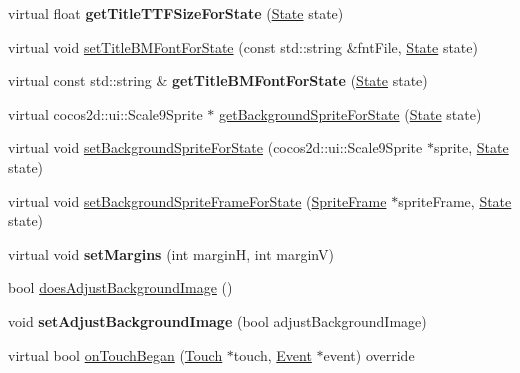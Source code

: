 \begin{DoxyCompactItemize}
\item 
\mbox{\label{classControlButton_a71d45fe402f7fe262440166504de41fb}} 
virtual float {\bfseries get\+Title\+T\+T\+F\+Size\+For\+State} (\hyperlink{classControl_a89e9598cd785841ac91cff3c4798c469}{State} state)
\item 
virtual void \hyperlink{classControlButton_a12e4a9d12d8eb9e267ac750cd14a1d91}{set\+Title\+B\+M\+Font\+For\+State} (const std\+::string \&fnt\+File, \hyperlink{classControl_a89e9598cd785841ac91cff3c4798c469}{State} state)
\item 
\mbox{\label{classControlButton_a0e19eaac23a11d0cffd989c947ec96df}} 
virtual const std\+::string \& {\bfseries get\+Title\+B\+M\+Font\+For\+State} (\hyperlink{classControl_a89e9598cd785841ac91cff3c4798c469}{State} state)
\item 
virtual cocos2d\+::ui\+::\+Scale9\+Sprite $\ast$ \hyperlink{classControlButton_ade0370ec919695bcd844b9c94e1697be}{get\+Background\+Sprite\+For\+State} (\hyperlink{classControl_a89e9598cd785841ac91cff3c4798c469}{State} state)
\item 
virtual void \hyperlink{classControlButton_a9be0490a60e89847a0c6d69cc65d36f8}{set\+Background\+Sprite\+For\+State} (cocos2d\+::ui\+::\+Scale9\+Sprite $\ast$sprite, \hyperlink{classControl_a89e9598cd785841ac91cff3c4798c469}{State} state)
\item 
virtual void \hyperlink{classControlButton_a0464d66cede6268181dd95c7c6a10c0f}{set\+Background\+Sprite\+Frame\+For\+State} (\hyperlink{classSpriteFrame}{Sprite\+Frame} $\ast$sprite\+Frame, \hyperlink{classControl_a89e9598cd785841ac91cff3c4798c469}{State} state)
\item 
\mbox{\label{classControlButton_aa186dc91780a911f81c9da6037dc6733}} 
virtual void {\bfseries set\+Margins} (int marginH, int marginV)
\item 
bool \hyperlink{classControlButton_a35b9bc222f10096a0c9122dc87ae82aa}{does\+Adjust\+Background\+Image} ()
\item 
\mbox{\label{classControlButton_a88a870284768d1de8371832ecdfa52c3}} 
void {\bfseries set\+Adjust\+Background\+Image} (bool adjust\+Background\+Image)
\item 
virtual bool \hyperlink{classControlButton_a170cc0df0207fba7bc352acc6173d948}{on\+Touch\+Began} (\hyperlink{classTouch}{Touch} $\ast$touch, \hyperlink{classEvent}{Event} $\ast$event) override

\end{DoxyCompactItemize}
